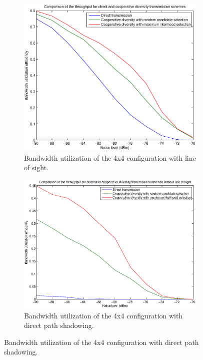 \begin{figure}
	\centering
	\begin{subfigure}{}
		\includegraphics[scale=.45]{figures/4x4throughput}
		\caption{Bandwidth utilization of the 4x4 configuration with line of sight.}
		\label{fig:4x4throughput}
	\end{subfigure}
	
	\vspace{2cm}
	
	\begin{subfigure}{}
		\includegraphics[scale=.4]{figures/4x4throughput_shadowing}
		\caption{Bandwidth utilization of the 4x4 configuration with direct path shadowing.}
		\label{fig:4x4throughputshadowing}
	\end{subfigure}
\end{figure}